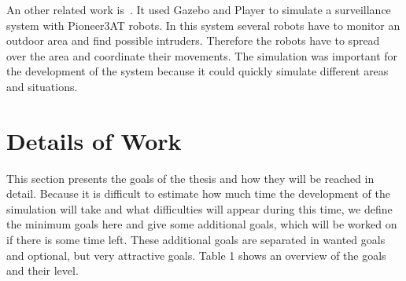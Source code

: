 \documentclass[11pt,a4paper,titlepage]{article}
\begin{document}
An other related work is~\cite{SurveillanceSystem}. It used Gazebo and Player to simulate a surveillance system with Pioneer3AT robots. In this system several robots have to monitor an outdoor area and find possible intruders. Therefore the robots have to spread over the area and coordinate their movements. The simulation was important for the development of the system because it could quickly simulate different areas and situations.

\section{Details of Work}
This section presents the goals of the thesis and how they will be reached in detail. Because it is difficult to estimate how much time the development of the simulation will take and what difficulties will appear during this time, we define the minimum goals here and give some additional goals, which will be worked on if there is some time left. These additional goals are separated in wanted goals and optional, but very attractive goals. Table 1 shows an overview of the goals and their level.
\end{document}

